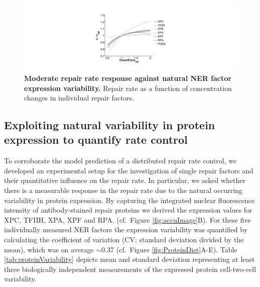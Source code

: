 \begin{figure}[htbp]
	\begin{center}
		\includegraphics[width=1\textwidth]{Abbildungen/figure3_1_b.pdf}
		\caption{\textbf{Moderate repair rate response against natural NER factor expression variability.} Repair rate as a function of concentration changes in individual repair factors.}
		\label{fig:R_largeProteinVariation}
	\end{center}
\end{figure}

\subsection{Exploiting natural variability in protein expression to quantify rate control}

To corroborate the model prediction of a distributed repair rate control, we developed an experimental setup for the investigation of single repair factors and their quantitative influence on the repair rate. In particular, we asked whether there is a measurable response in the repair rate due to the natural occurring variability in protein expression. By capturing the integrated nuclear fluorescence intensity of antibody-stained repair proteins we derived the expression values for XPC, TFIIH, XPA, XPF and RPA. (cf.\ Figure \ref{fig:accuImage}B). For these five individually measured NER factors the expression variability was quantified by calculating the coefficient of variation (CV; standard deviation divided by the mean), which was on average $\sim$0.37 (cf.\ Figure \ref{fig:ProteinDist}A-E). Table \ref{tab:proteinVariability} depicts mean and standard deviation representing at least three biologically independent measurements of the expressed protein cell-two-cell variability.

